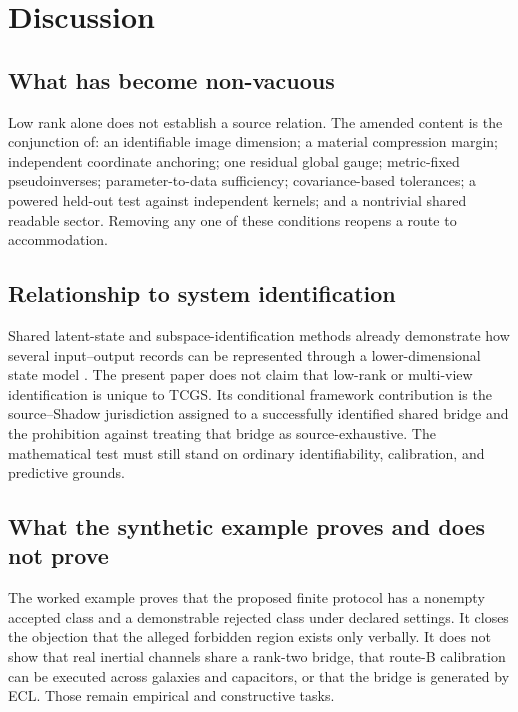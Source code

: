 \documentclass[11pt]{article}
\begin{document}
\section{Discussion}

\subsection{What has become non-vacuous}

Low rank alone does not establish a source relation. The amended content is the conjunction of: an identifiable image dimension; a material compression margin; independent coordinate anchoring; one residual global gauge; metric-fixed pseudoinverses; parameter-to-data sufficiency; covariance-based tolerances; a powered held-out test against independent kernels; and a nontrivial shared readable sector. Removing any one of these conditions reopens a route to accommodation.

\subsection{Relationship to system identification}

Shared latent-state and subspace-identification methods already demonstrate how several input--output records can be represented through a lower-dimensional state model \cite{Ljung1999,VanOverscheeDeMoor1996}. The present paper does not claim that low-rank or multi-view identification is unique to TCGS. Its conditional framework contribution is the source--Shadow jurisdiction assigned to a successfully identified shared bridge and the prohibition against treating that bridge as source-exhaustive. The mathematical test must still stand on ordinary identifiability, calibration, and predictive grounds.

\subsection{What the synthetic example proves and does not prove}

The worked example proves that the proposed finite protocol has a nonempty accepted class and a demonstrable rejected class under declared settings. It closes the objection that the alleged forbidden region exists only verbally. It does not show that real inertial channels share a rank-two bridge, that route-B calibration can be executed across galaxies and capacitors, or that the bridge is generated by ECL. Those remain empirical and constructive tasks.
\end{document}
